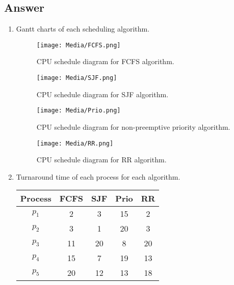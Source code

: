 \documentclass[a4paper,11pt]{article}
\begin{document}
\subsection{Answer}
\begin{enumerate}[label=\alph*.]
    \item Gantt charts of each scheduling algorithm.
    \begin{figure}[h]
      \centering
      \texttt{[image: Media/FCFS.png]}
      \caption{CPU schedule diagram for FCFS algorithm.}
      \label{fig:FCFS}
    \end{figure}
    \begin{figure}[h]
      \centering
      \texttt{[image: Media/SJF.png]}
      \caption{CPU schedule diagram for SJF algorithm.}
      \label{fig:SJF}
    \end{figure}
    \begin{figure}[h]
      \centering
      \texttt{[image: Media/Prio.png]}
      \caption{CPU schedule diagram for non-preemptive priority algorithm.}
      \label{fig:Prio}
    \end{figure}
    \begin{figure}[h]
      \centering
      \texttt{[image: Media/RR.png]}
      \caption{CPU schedule diagram for RR algorithm.}
      \label{fig:RR}
    \end{figure}
    \pagebreak
    \item Turnaround time of each process for each algorithm.
    \begin{table}[h]
        \begin{center}
            \begin{tabular}{c|c|c|c|c}
                \textbf{Process} & \textbf{FCFS} & \textbf{SJF} & \textbf{Prio} & \textbf{RR}\\
                \hline
                $p_1$   &   2    &   3    &   15   &   2\\
                $p_2$   &   3    &   1    &   20   &   3\\
                $p_3$   &   11   &   20   &   8    &   20\\
                $p_4$   &   15   &   7    &   19   &   13\\
                $p_5$   &   20   &   12   &   13   &   18\\
            \end{tabular}
            \label{tab:table3}
        \end{center}
    \end{table}

\end{enumerate}
\end{document}
